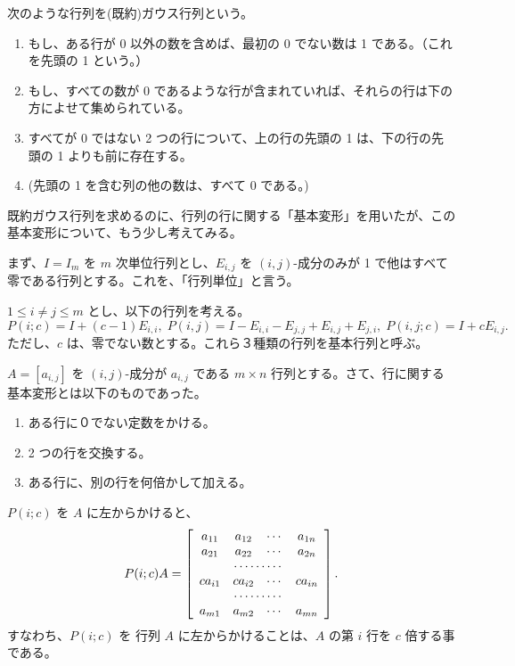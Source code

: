 \begin{definition}
次のような行列を{\gt (既約)ガウス行列}という。
\begin{enumerate}
\item もし、ある行が 0 以外の数を含めば、最初の 0 でない数は 1 である。（これを先頭の 1 という。）
\item もし、すべての数が 0 であるような行が含まれていれば、それらの行は下の方によせて集められている。
\item すべてが 0 ではない 2 つの行について、上の行の先頭の 1 は、下の行の先頭の 1 よりも前に存在する。
\item (先頭の 1 を含む列の他の数は、すべて 0 である。)
\end{enumerate}
\end{definition}

\newpage
{}
既約ガウス行列を求めるのに、行列の行に関する「基本変形」を用いたが、この基本変形について、もう少し考えてみる。

まず、$I = I_m$ を $m$ 次単位行列とし、$E_{i,j}$ を $(i,j)$-成分のみが 1 で他はすべて零である行列とする。これを、「行列単位」と言う。

$1\leq i\neq j\leq m$ とし、以下の行列を考える。
$$P(i;c) = I + (c-1)E_{i,i}, \;P(i,j) = I - E_{i,i}-E_{j,j}+E_{i,j}+E_{j,i},\;P(i,j;c) = I + cE_{i,j}.$$
ただし、$c$ は、零でない数とする。これら３種類の行列を{\gt 基本行列}と呼ぶ。

\smallskip
$A = [a_{i,j}]$ を $(i,j)$-成分が $a_{i,j}$ である $m\times n$ 行列とする。さて、行に関する基本変形とは以下のものであった。

\begin{enumerate}
\item ある行に０でない定数をかける。
\item 2 つの行を交換する。
\item ある行に、別の行を何倍かして加える。
\end{enumerate}

$P(i;c)$ を $A$ に左からかけると、
$$P(i;c)A = \left[\begin{array}{cccc}a_{11} & a_{12} & \cdots & a_{1n} \\
a_{21} & a_{22} & \cdots & a_{2n}\\
\multicolumn{4}{c}{\cdots\cdots\cdots}\\
ca_{i1} & ca_{i2} & \cdots & ca_{in}\\
\multicolumn{4}{c}{\cdots\cdots\cdots}\\
a_{m1} & a_{m2} & \cdots & a_{mn}
\end{array}\right].$$
すなわち、$P(i;c)$ を 行列 $A$ に左からかけることは、$A$ の第 $i$ 行を $c$ 倍する事である。

